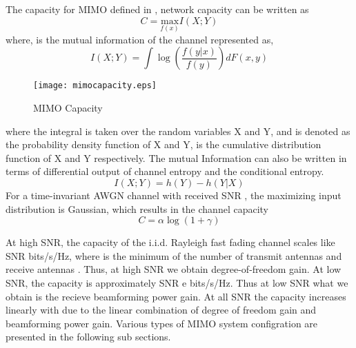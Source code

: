The capacity for \ac{MIMO} defined in \cite{weingarten2004capacity}, network capacity can be written as
\begin{equation}
C = \underset{f(x)}{\text{max}} I(X;Y) 
\label{bgmimo2_eqn}
\end{equation} 
where,  is the mutual information of the channel represented as,
\begin{equation}
I(X;Y) = \int \log (\dfrac{f(y|x)}{f(y)}) dF(x,y)
\label{bgmimo3_eqn}
\end{equation}
\begin{figure}[h]
	\begin{center}
		\texttt{[image: mimocapacity.eps]}
		\caption{MIMO Capacity}
	\end{center}
\end{figure}
where the integral is taken over the random variables X and Y,  and  is denoted as the probability density function of X and Y,  is the cumulative distribution function of X and Y respectively. The mutual Information can also be written in terms of differential output of channel entropy and the conditional entropy. 
\begin{equation}
I(X;Y) = h(Y) - h(Y|X)
\label{bgmimo4_eqn}
\end{equation}
For a time-invariant \ac{AWGN} channel with received \ac{SNR} \me{\gamma}, the maximizing input distribution is Gaussian, which results in the channel capacity	
\begin{equation}
C = \alpha \log (1 + \gamma)
\label{bgmimo5_eqn}
\end{equation}

At high \ac{SNR}, the capacity of the i.i.d. Rayleigh fast fading channel scales like  SNR bits/s/Hz, where  is the minimum of the number of transmit antennas  and receive antennas . Thus, at high \ac{SNR} we obtain degree-of-freedom gain. At low \ac{SNR}, the capacity is approximately  SNR e bits/s/Hz. Thus at low \ac{SNR} what we obtain is the recieve beamforming power gain. At all \ac{SNR} the capacity increases linearly with  due to the linear combination of degree of freedom gain and beamforming power gain. Various types of \ac{MIMO} system configration are presented in the following sub sections.


